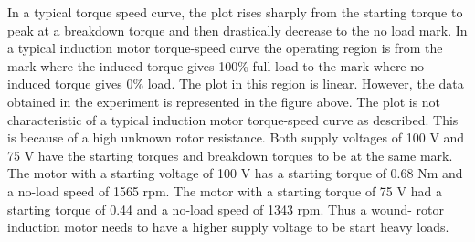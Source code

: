 \documentclass{article}
\begin{document}
In a typical torque speed curve, the plot rises sharply from the starting torque to peak at a breakdown torque and then 
drastically decrease to the no load mark. In a typical induction motor torque-speed curve the operating region is from 
the mark where the induced torque gives 100\% full load to the mark where no induced torque gives 0\% load. The plot in 
this region is linear. However, the data obtained in the experiment is represented in the figure above. The plot is
not characteristic of a typical induction motor torque-speed curve as described. This is because of a high unknown 
rotor resistance. Both supply voltages of 100 V and 75 V have the starting torques and breakdown torques to be at the 
same mark. The motor with a starting voltage of 100 V has a starting torque of 0.68 Nm and a no-load speed of 1565 rpm. 
The motor with a starting torque of 75 V had a starting torque of 0.44 and a no-load speed of 1343 rpm. Thus a wound-
rotor induction motor needs to have a higher supply voltage to be start heavy loads. 
\end{document}
